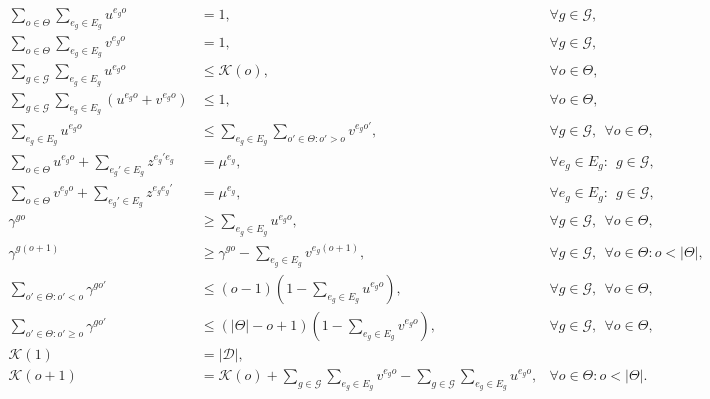 \begin{footnotesize}
\begin{align}
\sum_{o \in \Theta} \sum_{e_g\in E_g} u^{e_g o} &= 1, &\forall g \in \mathcal{G}, \label{eq:drone1}\\ 
\sum_{o \in \Theta} \sum_{e_g\in E_g} v^{e_g o} &= 1, &\forall g \in \mathcal{G}, \label{eq:drone2}\\
\sum_{g\in\mathcal {G}} \sum_{e_g \in E_g} u^{e_g o} &\leq \mathcal{K}(o), &\forall o \in \Theta, \label{eq:drone3}\\
\sum_{g\in\mathcal {G}} \sum_{e_g \in E_g} (u^{e_g o} + v^{e_g o}) &\leq 1, &\forall o \in \Theta, \label{eq:drone4}\\
\sum_{e_g \in E_g} u^{e_g o} &\leq \sum_{e_g \in E_g} \sum_{o' \in \Theta: o'>o} v^{e_g o'}, &\forall g\in\mathcal G, \:\: \forall o \in \Theta, \label{eq:drone5}\\
\sum_{o \in \Theta} u^{e_g o} + \sum_{e_g' \in E_g}z^{e_g'e_g} &= \mu^{e_g}, &\forall e_g \in E_g: \:\:  g \in \mathcal{G}, \label{eq:drone6}\\
\sum_{o \in \Theta} v^{e_g o} + \sum_{e_g' \in E_g}z^{e_g e_g'} &= \mu^{e_g}, &\forall e_g \in E_g: \:\: g \in \mathcal{G}, \label{eq:drone7}\\
\gamma^{go} &\geq \sum_{e_g \in E_g} u^{e_g o}, &\forall g \in \mathcal{G}, \:\: \forall o \in \Theta, \label{eq:drone8}\\
\gamma^{g(o+1)} &\geq \gamma^{go} - \sum_{e_g \in E_g} v^{e_g (o+1)},  &\forall g \in \mathcal{G}, \:\: \forall o \in \Theta: o < |\Theta|, \label{eq:drone9}\\
\sum_{o'\in\Theta : o' < o} \gamma^{go'} &\leq (o-1)(1- \sum_{e_g\in E_g} u^{e_g o}), &\forall g\in\mathcal G, \:\: \forall o \in \Theta, \label{eq:drone10}\\
\sum_{o' \in \Theta: o' \geq o} \gamma^{go'} &\leq \left(|\Theta| - o + 1\right) (1- \sum_{e_g\in E_g}v^{e_g o}), &\forall g\in\mathcal G, \:\: \forall o \in \Theta, \label{eq:drone11}\\
\mathcal{K}(1) &= |\mathcal{D}|, \label{eq:drone12}\\
\mathcal{K}(o+1) &= \mathcal{K}(o) + \sum_{g\in\mathcal {G}} \sum_{e_g \in E_g} v^{e_g o} - \sum_{g\in\mathcal G}\sum_{e_g \in E_g} u^{e_g o}, &\forall o \in \Theta: o<|\Theta|. \label{eq:drone13}
\end{align}
\end{footnotesize}

